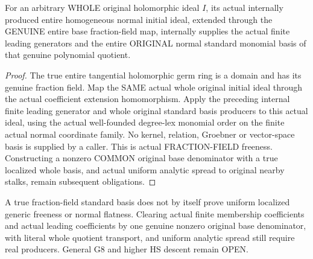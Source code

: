 \begin{theorem}
\label{hir:relative-normal-standard-original-fraction-field}
\leanok
{}
For an arbitrary WHOLE original holomorphic ideal $I$, its actual internally
produced entire homogeneous normal initial ideal, extended through the
GENUINE entire base fraction-field map, internally supplies the actual
finite leading generators and the entire ORIGINAL normal standard monomial
basis of that genuine polynomial quotient.
\end{theorem}
\begin{proof}
The true entire tangential holomorphic germ ring is a domain and has its
genuine fraction field. Map the SAME actual whole original initial ideal
through the actual coefficient extension homomorphism. Apply the preceding
internal finite leading generator and whole original standard basis
producers to this actual ideal, using the actual well-founded degree-lex
monomial order on the finite actual normal coordinate family. No kernel,
relation, Groebner or vector-space basis is supplied by a caller. This is
actual FRACTION-FIELD freeness. Constructing a nonzero COMMON original base
denominator with a true localized whole basis, and actual uniform analytic
spread to original nearby stalks, remain subsequent obligations.
\end{proof}

\begin{remark}
A true fraction-field standard basis does not by itself prove uniform
localized generic freeness or normal flatness. Clearing actual finite
membership coefficients and actual leading coefficients by one genuine
nonzero original base denominator, with literal whole quotient transport,
and uniform analytic spread still require real producers. General G8 and
higher HS descent remain OPEN.
\end{remark}

